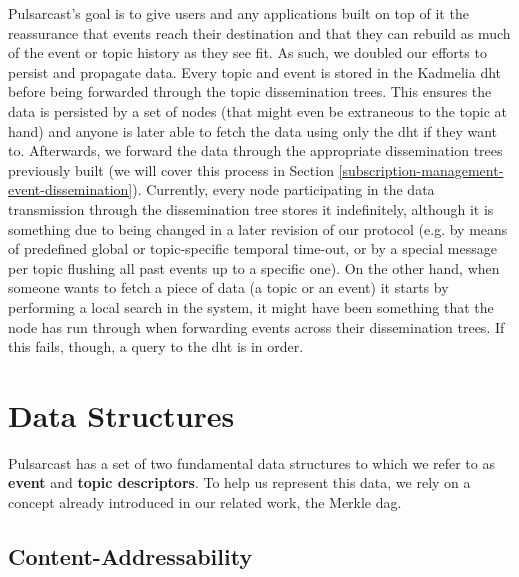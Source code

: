 Pulsarcast's goal is to give users and any applications built on top of it the
reassurance that events reach their destination and that they can rebuild as
much of the event or topic history as they see fit. As such, we doubled our
efforts to persist and propagate data. Every topic and event is stored in the
Kadmelia \acrshort{dht} before being forwarded through the topic dissemination
trees.  This ensures the data is persisted by a set of nodes (that might even
be extraneous to the topic at hand) and anyone is later able to fetch the data
using only the \acrshort{dht} if they want to. Afterwards, we forward the data
through the appropriate dissemination trees previously built (we will cover
this process in Section \ref{subscription-management-event-dissemination}).
Currently, every node participating in the data transmission through the
dissemination tree stores it indefinitely, although it is something due to
being changed in a later revision of our protocol (e.g. by means of predefined
global or topic-specific temporal time-out, or by a special message per topic
flushing all past events up to a specific one). On the other hand, when someone
wants to fetch a piece of data (a topic or an event) it starts by performing a
local search in the system, it might have been something that the node has run
through when forwarding events across their dissemination trees. If this fails,
though, a query to the \acrshort{dht} is in order.

\section{Data Structures}\label{data-structures}

Pulsarcast has a set of two fundamental data structures to which we refer to as
\textbf{event} and \textbf{topic descriptors}. To help us represent this data,
we rely on a concept already introduced in our related work, the Merkle
\acrshort{dag}.

\subsection{Content-Addressability}\label{subsec:content-addressability}

